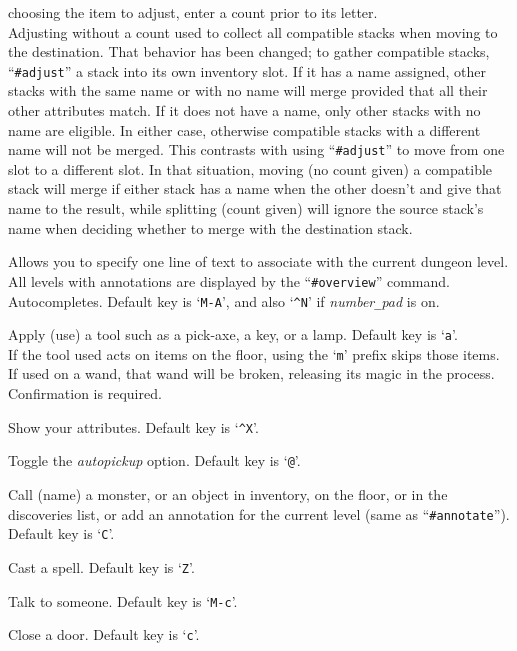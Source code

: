 choosing the item to adjust, enter a count prior to its letter.\\
Adjusting without a count used to collect all compatible stacks when
moving to the destination.  That behavior has been changed; to gather
compatible stacks, ``{\tt \#adjust}'' a stack into its own inventory slot.
If it has a name assigned, other stacks with the same name or with
no name will merge provided that all their other attributes match.
If it does not have a name, only other stacks with no name are eligible.
In either case, otherwise compatible stacks with a different name
will not be merged.  This contrasts with using ``{\tt \#adjust}'' to move
from one slot to a different slot.  In that situation, moving (no
count given) a compatible stack will merge if either stack has a
name when the other doesn't and give that name to the result, while
splitting (count given) will ignore the source stack's name when
deciding whether to merge with the destination stack.
\item[\tb{\#annotate}]
Allows you to specify one line of text to associate with the current
dungeon level.  All levels with annotations are displayed by the
``{\tt \#overview}'' command. Autocompletes.
Default key is `{\tt M-A}',
and also `{\tt \^{}N}' if {\it number\verb+_+pad\/} is on.
\item[\tb{\#apply}]
Apply (use) a tool such as a pick-axe, a key, or a lamp.
Default key is `{\tt a}'.\\
If the tool used acts on items on the floor, using the `{\tt m}' prefix
skips those items.\\
If used on a wand, that wand will be broken, releasing its magic in the
process.  Confirmation is required.
\item[\tb{\#attributes}]
Show your attributes. Default key is `{\tt \^{}X}'.
\item[\tb{\#autopickup}]
Toggle the {\it autopickup\/} option. Default key is `{\tt @}'.
\item[\tb{\#call}]
Call (name) a monster, or an object in inventory, on the floor,
or in the discoveries list, or add an annotation for the
current level (same as ``{\tt \#annotate}''). Default key is `{\tt C}'.
\item[\tb{\#cast}]
Cast a spell. Default key is `{\tt Z}'.
\item[\tb{\#chat}]
Talk to someone. Default key is `{\tt M-c}'.
\item[\tb{\#close}]
Close a door. Default key is `{\tt c}'.
